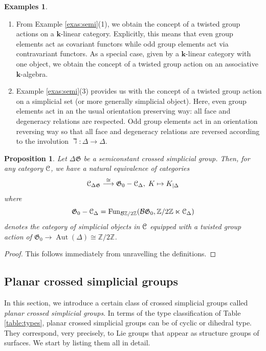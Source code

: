 \documentclass[english,11pt,leqno]{article}
\def\Gen{\mathfrak{G}}
\def\Aut{\operatorname{Aut}\nolimits}
\def\lra{\longrightarrow}
\def\k{\mathbf{k}}
\def\Fun{\operatorname{Fun}}
\def\B{ {\EuScript B}}
\def\C{{\EuScript C}}
\def\Zt{\mathbb{Z}/2\mathbb{Z}}
\def\BZt{{\mathcal B}\mathbb{Z}/2\mathbb{Z}}
\def\B{{\mathcal B}}
\def\DG{ {\Delta \Gen}}
\newtheorem{prop}[thm]{Proposition}
\theoremstyle{definition}
\newtheorem{exas}[thm]{Examples}
\theoremstyle{remark}
\numberwithin{equation}{section}
\begin{document}
\begin{exas} \begin{enumerate} 
	\item From Example \ref{exas:semi}(1), we obtain the concept of a twisted group
		actions on a $\k$-linear category. Explicitly, this means that even group elements act as 
		covariant functors while odd group elements act via contravariant functors. As a special case, given
		by a $\k$-linear category with one object, we obtain the concept of a twisted group action on an
		associative $\k$-algebra. 
	\item Example \ref{exas:semi}(3) provides us with the concept of a twisted group action on a
		simplicial set (or more generally simplicial object). Here, even group elements act
		in an the usual orientation preserving way: all face and degeneracy relations are
		respected. Odd group elements act in an orientation reversing way so that all face
		and degeneracy relations are reversed according to the involution $\daleth: \Delta \to
		\Delta$.
	\end{enumerate}
\end{exas}

\begin{prop}\label{prop:main} Let $\DG$ be a semiconstant crossed simplicial group. Then, for any category $\C$, 
	we have a natural equivalence of categories
	\[
		\C_{\DG} \overset{\cong}{\lra} \Gen_0-\C_{\Delta}, \; K \mapsto K_{| \Delta} 
	\]
	where 
	\[
		\Gen_0-\C_{\Delta} = \Fun_{\BZt}(\B \Gen_0, \Zt \ltimes \C_{\Delta})
	\]
	denotes the category of simplicial objects in $\C$ equipped with a twisted
	group action of $\Gen_0 \to \Aut(\Delta) \cong \Zt$.
\end{prop}
\begin{proof} This follows immediately from unravelling the definitions.
\end{proof}

\newpage

\subsection{Planar crossed simplicial groups}\label{sub:cross-examples}
 
In this section, we introduce a certain class of crossed simplicial groups called {\em planar
crossed simplicial groups}. In terms of the type classification of Table \ref{table:types}, planar
crossed simplicial groups can be of cyclic or dihedral type. They correspond, very precisely, to Lie
groups that appear as structure groups of surfaces. We start by listing them all in detail. 
\end{document}
